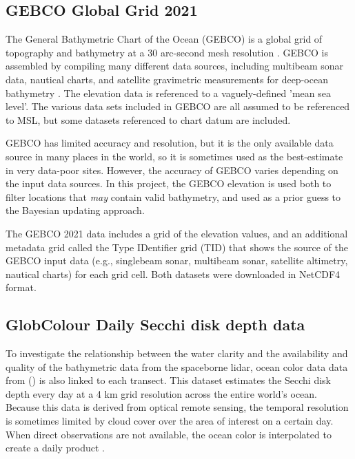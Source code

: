 \subsection{GEBCO Global Grid 2021}

The General Bathymetric Chart of the Ocean (GEBCO) is a global grid of topography and bathymetry at a 30 arc-second mesh resolution \parencite{gebco2021griddata}. GEBCO is assembled by compiling many different data sources, including multibeam sonar data, nautical charts, and satellite gravimetric measurements for deep-ocean bathymetry \parencite{gebcocookbook}. The elevation data is referenced to a vaguely-defined 'mean sea level'. The various data sets included in GEBCO are all assumed to be referenced to MSL, but some datasets referenced to chart datum are included. 

GEBCO has limited accuracy and resolution, but it is the only available data source in many places in the world, so it is sometimes used as the best-estimate in very data-poor sites. However, the accuracy of GEBCO varies depending on the input data sources. In this project, the GEBCO elevation is used both to filter locations that \emph{may} contain valid bathymetry, and used as a prior guess to the Bayesian updating approach. 

The GEBCO 2021 data includes a grid of the elevation values, and an additional metadata grid called the Type IDentifier grid (TID) that shows the source of the GEBCO input data (e.g., singlebeam sonar, multibeam sonar, satellite altimetry, nautical charts) for each grid cell. Both datasets were downloaded in NetCDF4 format.


\subsection{GlobColour Daily Secchi disk depth data}

To investigate the relationship between the water clarity and the availability and quality of the bathymetric data from the spaceborne lidar, ocean color data data from \citeauthor{Garnesson2019}(\citeyear{Garnesson2019}) is also linked to each transect. This dataset estimates the Secchi disk depth every day at a 4 km grid resolution across the entire world's ocean. Because this data is derived from optical remote sensing, the temporal resolution is sometimes limited by cloud cover over the area of interest on a certain day. When direct observations are not available, the ocean color is interpolated to create a daily product \parencite{Garnesson2019}.

